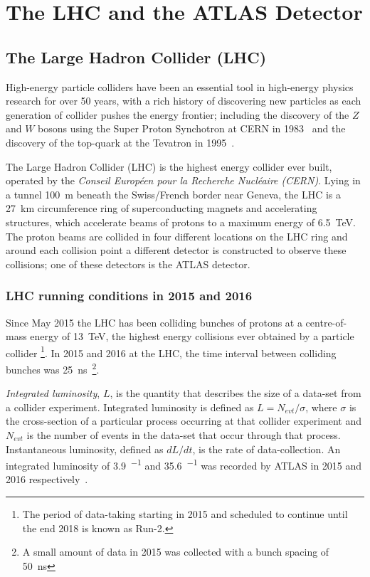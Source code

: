 \chapter{The LHC and the ATLAS Detector}
\label{sec:det}

\section{The Large Hadron Collider (LHC)}
\label{sec:det-LHC}

High-energy particle colliders have been an essential tool in high-energy physics research for over 50 years,
with a rich history of discovering new particles as each generation of collider pushes the energy frontier;
including the discovery of the $Z$ and $W$ bosons using the Super Proton Synchotron at CERN in 1983~\cite{det-Wdisc_UA1, det-Zdisc_UA1, det-Wdisc_UA2, det-Zdisc_UA2} 
and the discovery of the  top-quark at the Tevatron in 1995~\cite{det-tdisc_CDF, det-tdisc_D0}.

The Large Hadron Collider (LHC) is the highest energy collider ever built,
operated by the \textit{Conseil Europ\'een pour la Recherche Nucl\'eaire (CERN)}.
Lying in a tunnel \SI{100}{\metre} beneath the Swiss/French border near Geneva,
the LHC is a \SI{27}{\km} circumference ring of superconducting magnets and accelerating structures,
which accelerate beams of protons to a maximum energy of \SI{6.5}{\TeV}.
The proton beams are collided in four different locations on the LHC ring
and around each collision point a different detector is constructed to observe these collisions;
one of these detectors is the ATLAS detector.

\subsection{LHC running conditions in 2015 and 2016}

Since May 2015 the LHC has been colliding bunches of protons at a centre-of-mass energy of \SI{13}{\TeV},
the highest energy collisions ever obtained by a particle collider
\footnote{The period of data-taking starting in 2015 and scheduled to continue until the end 2018 is known as Run-2.}.
In 2015 and 2016 at the LHC, the time interval between colliding bunches was \SI{25}{\nano\second}~\footnote{A small amount of data in 2015 was collected with a bunch spacing of \SI{50}{\nano\second}}.

\textit{Integrated luminosity}, $L$, is the quantity that describes the size of a data-set from a collider experiment.
Integrated luminosity is defined as $L = N_{evt}/\sigma$,
where $\sigma$ is the cross-section of a particular process occurring at that collider experiment
and $N_{evt}$ is the number of events in the data-set that occur through that process.
Instantaneous luminosity, defined as $dL/dt$, %
is the rate of data-collection.
An integrated luminosity of \SI{3.9}{\fb^{-1}} and \SI{35.6}{\fb^{-1}} was recorded by ATLAS in 2015 and 2016 respectively~\cite{det-ATLAS_lumi_twiki}.

